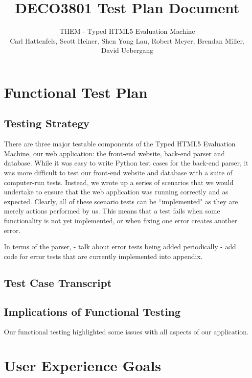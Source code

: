 \documentclass[10pt]{article}
\title{\bf DECO3801 Test Plan Document}
\author{\normalsize THEM - Typed HTML5 Evaluation Machine \\ \normalsize Carl Hattenfels, Scott Heiner, Shen Yong Lau, Robert Meyer, Brendan Miller, David Uebergang}
\date{}
\begin{document}
\maketitle

\section*{Functional Test Plan}

\subsection*{Testing Strategy}

There are three major testable components of the Typed HTML5 Evaluation Machine, our web application: the front-end website, back-end parser and database. While it was easy to write Python test cases for the back-end parser, it was more difficult to test our front-end website and database with a suite of computer-run tests. Instead, we wrote up a series of scenarios that we would undertake to ensure that the web application was running correctly and as expected. Clearly, all of these scenario tests can be ``implemented" as they are merely actions performed by us. This means that a test fails when some functionality is not yet implemented, or when fixing one error creates another error.

In terms of the parser,
- talk about error tests being added periodically
- add code for error tests that are currently implemented into appendix.

\subsection*{Test Case Transcript}


\subsection*{Implications of Functional Testing}

Our functional testing highlighted some issues with all aspects of our application.


\newpage

\section*{User Experience Goals}
\end{document}
